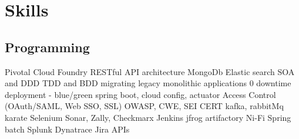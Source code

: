 \documentclass[]{deedy-resume-openfont}
\begin{document}
%
%
\lastupdated

%
%

%
%

\begin{minipage}[t]{0.33\textwidth} 



\section{Skills}
\subsection{Programming}

 \textbullet{} Pivotal Cloud Foundry \newline 
 \textbullet{} RESTful API architecture \newline
  \textbullet{} MongoDb \textbullet{} Elastic search \newline
 \textbullet{} SOA and DDD \newline 
 \textbullet{} TDD and BDD \newline 
 \textbullet{} migrating legacy monolithic applications \newline
 \textbullet{} 0 downtime deployment - blue/green \newline
 \textbullet{} spring boot, cloud config, actuator \newline 
 \textbullet{} Access Control (OAuth/SAML, Web SSO, SSL) \newline 
 \textbullet{} OWASP, CWE, SEI CERT \newline
 \textbullet{} kafka, rabbitMq \newline
 \textbullet{} karate \textbullet Selenium \newline
 \textbullet{} Sonar, Zally, Checkmarx \newline
 \textbullet{} Jenkins \textbullet{} jfrog artifactory \newline
 \textbullet{} Ni-Fi \textbullet{} Spring batch \newline
 \textbullet{} Splunk \textbullet{} Dynatrace \newline
 \textbullet{} Jira APIs
\sectionsep


\end{minipage}
\end{document}
